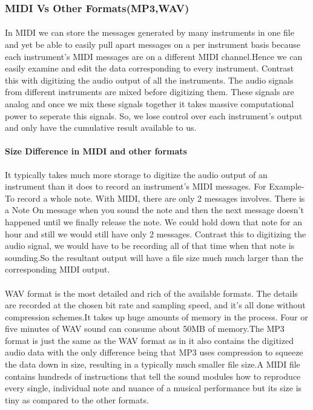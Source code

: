 \documentclass[12pt,a4paper]{article}
\begin{document}
\subsubsection{MIDI Vs Other Formats(MP3,WAV)}
\paragraph{}
In MIDI we can store the messages generated by many instruments in one file and yet be able to easily pull apart messages on a per instrument basis because each instrument’s MIDI messages are on a different MIDI channel.Hence we can easily examine and edit the data corresponding to every instrument.
Contrast this with digitizing the audio output of all the instruments. The audio signals from different instruments are mixed before digitizing them. These signals are analog and once we mix these signals together it takes massive computational power to seperate this signals. So, we lose control over each instrument’s output and only have the cumulative result available to us.
\paragraph{Size Difference in MIDI and other formats}
It typically takes much more storage to digitize the audio output of an instrument than it does to record an instrument’s MIDI messages. For Example-To record a whole note. With MIDI, there are only 2 messages involves. There is a Note On message when you sound the note and then the next message doesn’t happened until we finally release the note. We could hold down that note for an hour and still we would still have only 2 messages. Contrast this to digitizing the audio signal, we would have to be recording all of that time when that note is sounding.So the resultant output will have a file size much much larger than the corresponding MIDI output.
\\ \\
WAV format is the most detailed and rich of the available formats. The details are recorded at the chosen bit rate and sampling speed, and it's all done without compression schemes.It takes up huge amounts of memory in the process. Four or five minutes of WAV sound can consume about 50MB of memory.The MP3 format is just the same as the WAV format as in it also contains the digitized audio data with the only difference being that MP3 uses compression to squeeze the data down in size, resulting in a typically much smaller file size.A MIDI file contains hundreds of instructions that tell the sound modules how to reproduce every single, individual note and nuance of a musical performance but its size is tiny as compared to the other formats.
\pagebreak
\end{document}
